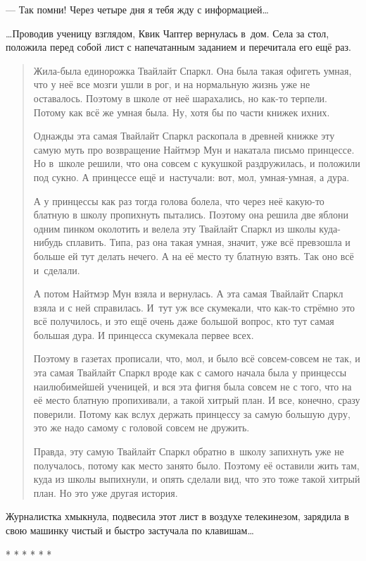 \documentclass[fontsize=11pt,a5paper,titlepage=firstcover]{scrbook}
\begin{document}
--- Так помни! Через четыре дня я тебя жду с информацией{\ldots}

{\ldots}Проводив ученицу взглядом, Квик Чаптер вернулась в~дом. Села за стол, положила перед собой лист с напечатанным заданием и перечитала его ещё раз.
\begin{quotation}
Жила-была единорожка Твайлайт Спаркл. Она была такая офигеть умная, что у неё все мозги ушли в рог, и на нормальную жизнь уже не оставалось. Поэтому в школе от неё шарахались, но как-то терпели. Потому как всё же умная была. Ну, хотя бы по части книжек ихних.

Однажды эта самая Твайлайт Спаркл раскопала в древней книжке эту самую муть про возвращение Найтмэр Мун и накатала письмо принцессе. Но в~школе решили, что она совсем с кукушкой раздружилась, и положили под сукно. А принцессе ещё и~настучали: вот, мол, умная-умная, а дура.

А у принцессы как раз тогда голова болела, что через неё какую-то блатную в школу пропихнуть пытались. Поэтому она решила две яблони одним пинком околотить и велела эту Твайлайт Спаркл из школы куда-нибудь сплавить. Типа, раз она такая умная, значит, уже всё превзошла и больше ей тут делать нечего. А на её место ту блатную взять. Так оно всё и~сделали.

А потом Найтмэр Мун взяла и вернулась. А эта самая Твайлайт Спаркл взяла и с ней справилась. И~тут уж все скумекали, что как-то стрёмно это всё получилось, и это ещё очень даже большой вопрос, кто тут самая большая дура. И принцесса скумекала первее всех.

Поэтому в газетах прописали, что, мол, и было всё  совсем-совсем не так, и эта самая Твайлайт Спаркл вроде как с самого начала была у принцессы наилюбимейшей ученицей, и вся эта фигня была совсем не с того, что на её место блатную пропихивали, а такой хитрый план. И все, конечно, сразу поверили. Потому как вслух держать принцессу за самую большую дуру, это же надо самому с головой совсем не дружить.

Правда, эту самую Твайлайт Спаркл обратно в~школу запихнуть уже не получалось, потому как место занято было. Поэтому её оставили жить там, куда из школы выпихнули, и опять сделали вид, что это тоже такой хитрый план. Но это уже другая история.
\end{quotation}
Журналистка хмыкнула, подвесила этот лист в воздухе телекинезом, зарядила в свою машинку чистый и быстро застучала по клавишам{\ldots}
\begin{center}* * * * * *\end{center}
\end{document}
